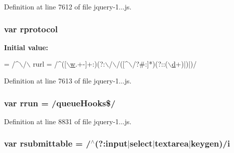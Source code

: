 Definition at line 7612 of file jquery-\/1...\+js.

\subsubsection[{\texorpdfstring{rprotocol}{rprotocol}}]{\setlength{\rightskip}{0pt plus 5cm}var rprotocol}\hypertarget{_scripts_2jquery-1_810_82_8js_a0f02b710647fcf95e74593954fb9b4cb}{}\label{_scripts_2jquery-1_810_82_8js_a0f02b710647fcf95e74593954fb9b4cb}
{\bfseries Initial value\+:}
\begin{DoxyCode}
= /^\(\backslash\)/\(\backslash\)
    rurl = /^([\hyperlink{obj_2_release_2_package_2_package_tmp_2_scripts_2respond_8min_8js_a9721a992655f700bdc2e91ba68b71e26}{\(\backslash\)w}.+-]+:)(?:\(\backslash\)/\(\backslash\)/([^\(\backslash\)/?#:]*)(?::(\hyperlink{obj_2_release_2_package_2_package_tmp_2_scripts_2bootstrap_8min_8js_aeb337d295abaddb5ec3cb34cc2e2bbc9}{\(\backslash\)d}+)|)|)/
\end{DoxyCode}


Definition at line 7613 of file jquery-\/1...\+js.

\subsubsection[{\texorpdfstring{rrun}{rrun}}]{\setlength{\rightskip}{0pt plus 5cm}var rrun = /queue\+Hooks\$/}\hypertarget{_scripts_2jquery-1_810_82_8js_acf9d5e6b315eca81eb432bb6ee280a2e}{}\label{_scripts_2jquery-1_810_82_8js_acf9d5e6b315eca81eb432bb6ee280a2e}


Definition at line 8831 of file jquery-\/1...\+js.

\subsubsection[{\texorpdfstring{rsubmittable}{rsubmittable}}]{\setlength{\rightskip}{0pt plus 5cm}var rsubmittable = /$^\wedge$(?\+:input$\vert$select$\vert$textarea$\vert$keygen)/{\bf i}}\hypertarget{_scripts_2jquery-1_810_82_8js_a12d248d7e6c5985c5ea21f56fbef9e90}{}\label{_scripts_2jquery-1_810_82_8js_a12d248d7e6c5985c5ea21f56fbef9e90}


